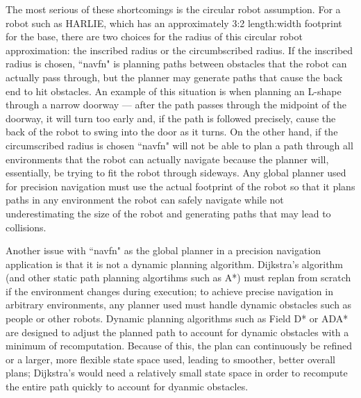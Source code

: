 The most serious of these shortcomings is the circular robot assumption. For a robot such as HARLIE, which has an approximately 3:2 length:width footprint for the base, there are two choices for the radius of this circular robot approximation: the inscribed radius or the circumbscribed radius. If the inscribed radius is chosen, ``navfn" is planning paths between obstacles that the robot can actually pass through, but the planner may generate paths that cause the back end to hit obstacles. An example of this situation is when planning an L-shape through a narrow doorway --- after the path passes through the midpoint of the doorway, it will turn too early and, if the path is followed precisely, cause the back of the robot to swing into the door as it turns. On the other hand, if the circumscribed radius is chosen ``navfn" will not be able to plan a path through all environments that the robot can actually navigate because the planner will, essentially, be trying to fit the robot through sideways. Any global planner used for precision navigation must use the actual footprint of the robot so that it plans paths in any environment the robot can safely navigate while not underestimating the size of the robot and generating paths that may lead to collisions.


Another issue with ``navfn" as the global planner in a precision navigation application is that it is not a dynamic planning algorithm. Dijkstra's algorithm (and other static path planning algortihms such as A*) must replan from scratch if the environment changes during execution; to achieve precise navigation in arbitrary environments, any planner used must handle dynamic obstacles such as people or other robots. Dynamic planning algorithms such as Field D* \autocite{FieldDStar} or ADA* \autocites{ADAStar}{DBLP:journals/ai/LikhachevFGST08} are designed to adjust the planned path to account for dynamic obstacles with a minimum of recomputation. Because of this, the plan can continuously be refined or a larger, more flexible state space used, leading to smoother, better overall plans; Dijkstra's would need a relatively small state space in order to recompute the entire path quickly to account for dyanmic obstacles.

